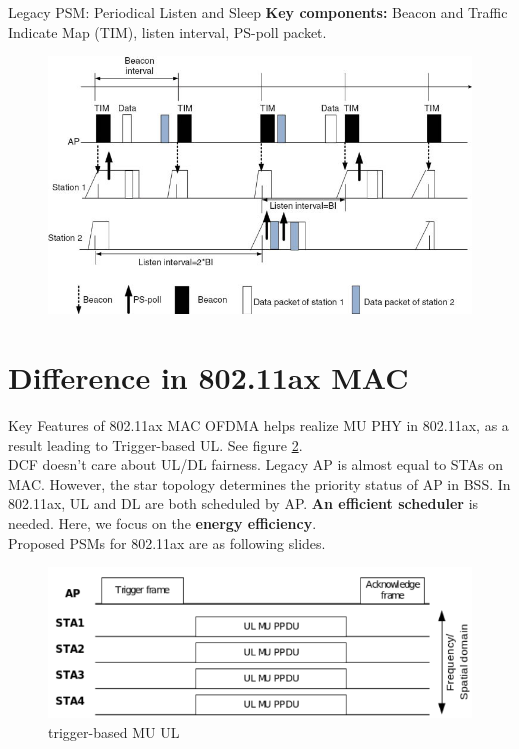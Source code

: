 \documentclass[10pt]{beamer}
\begin{document}
\begin{frame}{Legacy PSM: Periodical Listen and Sleep}
\textbf{Key components:} Beacon and Traffic Indicate Map (TIM), listen interval, PS-poll packet.   
\begin{figure}
\includegraphics[scale=0.8]{./figure/legacy_PSM.jpg}
\label{legacy_PSM}
\end{figure}
\end{frame}

\section{Difference in 802.11ax MAC}
\begin{frame}{Key Features of 802.11ax MAC}
OFDMA helps realize \alert{MU PHY} in 802.11ax, as a result leading to Trigger-based UL. See figure \ref{fig_mu_ul}.\\
DCF doesn't care about UL/DL fairness. Legacy AP is almost equal to STAs on MAC. However, the star topology determines the priority status of AP in BSS. In 802.11ax, UL and DL are both scheduled by AP. \textbf{An efficient scheduler} is needed. 
Here, we focus on the \textbf{energy efficiency}.\\
Proposed PSMs for 802.11ax are as following slides. 
\begin{figure}
\includegraphics[scale=0.35]{./figure/mu_ul.png}
\caption{trigger-based MU UL\cite{mu_ul}}
\label{fig_mu_ul}
\end{figure}
\end{frame}
\end{document}
